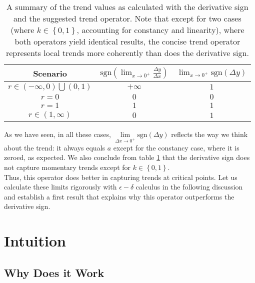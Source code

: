\documentclass[11pt]{book}
\begin{document}
\begin{table}[h!]
\centering
        \begin{tabular}{ccc}
        \toprule
        \textbf{Scenario} & \color[HTML]{FFA006} $\text{sgn}\left(\lim_{x\to0^{+}}\frac{\Delta y}{\Delta x}\right)$  & \color[HTML]{0039BD} $\lim_{x\to0^{+}}\text{sgn}\left(\Delta y\right)$ \\
        \midrule
        $r\in\left(-\infty,0\right) \bigcup \left(0,1\right)$ & \color[HTML]{FFA006} $+\infty$ & \color[HTML]{0039BD} $1$ \\
        $r=0$ & \color[HTML]{FFA006} $0$ & \color[HTML]{0039BD} $0$ \\
        $r=1$ & \color[HTML]{FFA006} $1$ & \color[HTML]{0039BD} $1$ \\
        $r\in\left(1,\infty \right)$ & \color[HTML]{FFA006} $0$ & \color[HTML]{0039BD} $1$ \\
        \bottomrule
        \end{tabular}
\color{black}
\caption{A summary of the trend values as calculated with the derivative sign and the suggested trend operator. Note that except for two cases (where $k\in\left\{0,1\right\}$, accounting for constancy and linearity), where both operators yield identical results, the concise trend operator represents local trends more coherently than does the derivative sign.}
\label{derivative_vs_detachment_summarizing_limits_table}
\end{table}

As we have seen, in all these cases, $\underset{\Delta x\rightarrow0^{+}}{\lim}\text{sgn}\left(\Delta y\right)$ reflects the way we think about the trend: it always equals $a$ except for the constancy case, where it is zeroed, as expected. We also conclude from table \ref{derivative_vs_detachment_summarizing_limits_table} that the derivative sign does not capture momentary trends except for $k\in \left\{0,1\right\}$. \\
Thus, this operator does better in capturing trends at critical points. Let us calculate these limits rigorously with $\epsilon-\delta$ calculus in the following discussion and establish a first result that explains why this operator outperforms the derivative sign.

\section{Intuition}

\subsection{Why Does it Work}
\end{document}

